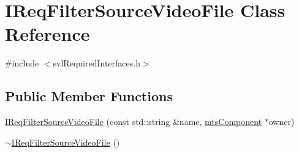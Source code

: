 \hypertarget{class_i_req_filter_source_video_file}{\section{I\-Req\-Filter\-Source\-Video\-File Class Reference}
\label{class_i_req_filter_source_video_file}
}


{\ttfamily \#include $<$svl\-Required\-Interfaces.\-h$>$}

\subsection*{Public Member Functions}
\begin{DoxyCompactItemize}
\item 
\hyperlink{class_i_req_filter_source_video_file_ac256b74fd6ecd31d61a75a2b104f4b0c}{I\-Req\-Filter\-Source\-Video\-File} (const std\-::string \&name, \hyperlink{classmts_component}{mts\-Component} $\ast$owner)
\item 
\hyperlink{class_i_req_filter_source_video_file_a1ecff9695438fdf9123c4128f65ab106}{$\sim$\-I\-Req\-Filter\-Source\-Video\-File} ()
\end{DoxyCompactItemize}
